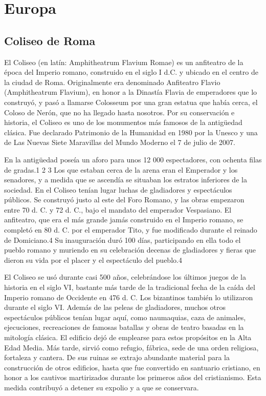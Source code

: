 \documentclass[a4paper,12pt]{article}
\begin{document}
\section{Europa} 
 \subsection{Coliseo de Roma}
 El Coliseo (en latín: Amphitheatrum Flavium Romae) es un anfiteatro de la época del Imperio romano, construido en el siglo I d.C. y ubicado en el centro de la ciudad de Roma. Originalmente era denominado Anfiteatro Flavio (Amphitheatrum Flavium), en honor a la Dinastía Flavia de emperadores que lo construyó, y pasó a llamarse Colosseum por una gran estatua que había cerca, el Coloso de Nerón, que no ha llegado hasta nosotros. Por su conservación e historia, el Coliseo es uno de los monumentos más famosos de la antigüedad clásica. Fue declarado Patrimonio de la Humanidad en 1980 por la Unesco y una de Las Nuevas Siete Maravillas del Mundo Moderno el 7 de julio de 2007.

En la antigüedad poseía un aforo para unos 12 000 espectadores, con ochenta filas de gradas.1 2 3 Los que estaban cerca de la arena eran el Emperador y los senadores, y a medida que se ascendía se situaban los estratos inferiores de la sociedad. En el Coliseo tenían lugar luchas de gladiadores y espectáculos públicos. Se construyó justo al este del Foro Romano, y las obras empezaron entre 70 d. C. y 72 d. C., bajo el mandato del emperador Vespasiano. El anfiteatro, que era el más grande jamás construido en el Imperio romano, se completó en 80 d. C. por el emperador Tito, y fue modificado durante el reinado de Domiciano.4 Su inauguración duró 100 días, participando en ella todo el pueblo romano y muriendo en su celebración decenas de gladiadores y fieras que dieron su vida por el placer y el espectáculo del pueblo.4

El Coliseo se usó durante casi 500 años, celebrándose los últimos juegos de la historia en el siglo VI, bastante más tarde de la tradicional fecha de la caída del Imperio romano de Occidente en 476 d. C. Los bizantinos también lo utilizaron durante el siglo VI. Además de las peleas de gladiadores, muchos otros espectáculos públicos tenían lugar aquí, como naumaquias, caza de animales, ejecuciones, recreaciones de famosas batallas y obras de teatro basadas en la mitología clásica. El edificio dejó de emplearse para estos propósitos en la Alta Edad Media. Más tarde, sirvió como refugio, fábrica, sede de una orden religiosa, fortaleza y cantera. De sus ruinas se extrajo abundante material para la construcción de otros edificios, hasta que fue convertido en santuario cristiano, en honor a los cautivos martirizados durante los primeros años del cristianismo. Esta medida contribuyó a detener su expolio y a que se conservara.
\end{document}
